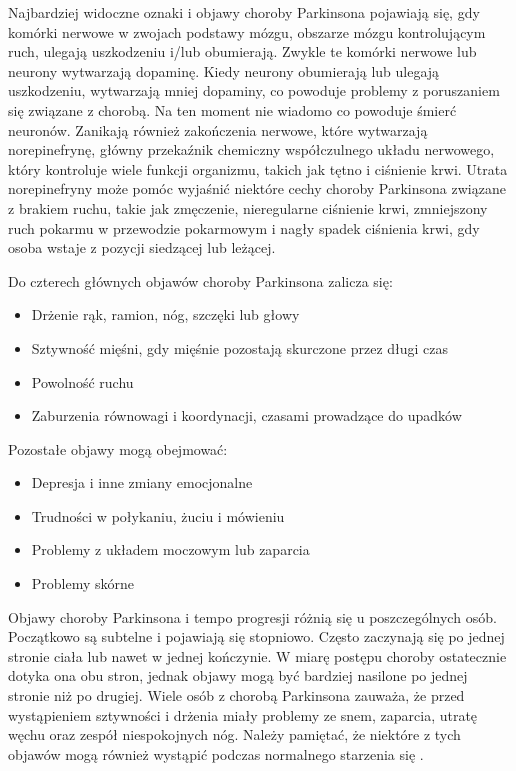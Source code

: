 Najbardziej widoczne oznaki i objawy choroby Parkinsona pojawiają się, gdy komórki nerwowe w zwojach podstawy mózgu,
obszarze mózgu kontrolującym ruch, ulegają uszkodzeniu i/lub obumierają.
Zwykle te komórki nerwowe lub neurony wytwarzają dopaminę.
Kiedy neurony obumierają lub ulegają uszkodzeniu, wytwarzają mniej dopaminy, co powoduje problemy z poruszaniem się
związane z chorobą.
Na ten moment nie wiadomo co powoduje śmierć neuronów.
Zanikają również zakończenia nerwowe, które wytwarzają norepinefrynę, główny przekaźnik chemiczny
współczulnego układu nerwowego, który kontroluje wiele funkcji organizmu, takich jak tętno i ciśnienie krwi.
Utrata norepinefryny może pomóc wyjaśnić niektóre cechy choroby Parkinsona związane z brakiem ruchu, takie jak zmęczenie,
nieregularne ciśnienie krwi, zmniejszony ruch pokarmu w przewodzie pokarmowym i nagły spadek ciśnienia krwi, gdy osoba wstaje z pozycji siedzącej lub leżącej.


Do czterech głównych objawów choroby Parkinsona zalicza się:
\begin{itemize}[itemsep=0.5pt]
	\item Drżenie rąk, ramion, nóg, szczęki lub głowy
	\item Sztywność mięśni, gdy mięśnie pozostają skurczone przez długi czas
	\item Powolność ruchu
	\item Zaburzenia równowagi i koordynacji, czasami prowadzące do upadków
\end{itemize}


Pozostałe objawy mogą obejmować:
\begin{itemize}[itemsep=0.5pt]
	\item Depresja i inne zmiany emocjonalne
	\item Trudności w połykaniu, żuciu i mówieniu
	\item Problemy z układem moczowym lub zaparcia
	\item Problemy skórne
\end{itemize}

Objawy choroby Parkinsona i tempo progresji różnią się u poszczególnych osób.
Początkowo są subtelne i pojawiają się stopniowo.
Często zaczynają się po jednej stronie ciała lub nawet w jednej kończynie.
W miarę postępu choroby ostatecznie dotyka ona obu stron, jednak objawy mogą być bardziej nasilone po jednej stronie niż po drugiej.
Wiele osób z chorobą Parkinsona zauważa, że przed wystąpieniem sztywności i drżenia miały problemy ze snem, zaparcia, utratę węchu oraz zespół niespokojnych nóg.
Należy pamiętać, że niektóre z tych objawów mogą również wystąpić podczas normalnego starzenia się \cite{National_Institute_on_Aging_2022}.

